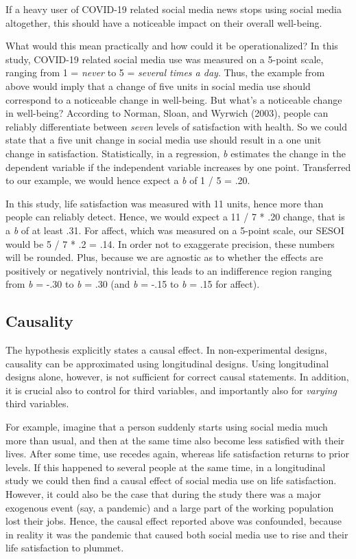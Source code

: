 \documentclass[
  english,
  man,mask,floatsintext]{apa6}
\begin{document}
If a heavy user of COVID-19 related social media news stops using social media altogether, this should have a noticeable impact on their overall well-being.

What would this mean practically and how could it be operationalized?
In this study, COVID-19 related social media use was measured on a 5-point scale, ranging from 1 = \emph{never} to 5 = \emph{several times a day}.
Thus, the example from above would imply that a change of five units in social media use should correspond to a noticeable change in well-being.
But what's a noticeable change in well-being?
According to Norman, Sloan, and Wyrwich (2003), people can reliably differentiate between \emph{seven} levels of satisfaction with health.
So we could state that a five unit change in social media use should result in a one unit change in satisfaction.
Statistically, in a regression, \emph{b} estimates the change in the dependent variable if the independent variable increases by one point.
Transferred to our example, we would hence expect a \emph{b} of 1 / 5 = .20.

In this study, life satisfaction was measured with 11 units, hence more than people can reliably detect.
Hence, we would expect a 11 / 7 * .20 change, that is a \emph{b} of at least .31.
For affect, which was measured on a 5-point scale, our SESOI would be 5 / 7 * .2 = .14.
In order not to exaggerate precision, these numbers will be rounded.
Plus, because we are agnostic as to whether the effects are positively or negatively nontrivial, this leads to an indifference region ranging from \emph{b} = -.30 to \emph{b} = .30 (and \emph{b} = -.15 to \emph{b} = .15 for affect).

\hypertarget{causality}{%
\subsection{Causality}\label{causality}}

The hypothesis explicitly states a causal effect.
In non-experimental designs, causality can be approximated using longitudinal designs.
Using longitudinal designs alone, however, is not sufficient for correct causal statements.
In addition, it is crucial also to control for third variables, and importantly also for \emph{varying} third variables.

For example, imagine that a person suddenly starts using social media much more than usual, and then at the same time also become less satisfied with their lives.
After some time, use recedes again, whereas life satisfaction returns to prior levels.
If this happened to several people at the same time, in a longitudinal study we could then find a causal effect of social media use on life satisfaction.
However, it could also be the case that during the study there was a major exogenous event (say, a pandemic) and a large part of the working population lost their jobs.
Hence, the causal effect reported above was confounded, because in reality it was the pandemic that caused both social media use to rise and their life satisfaction to plummet.
\end{document}
